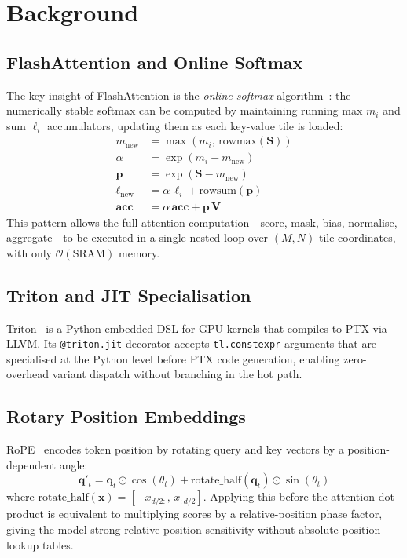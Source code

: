 \documentclass[10pt,twocolumn]{article}
\begin{document}
\section{Background}

\subsection{FlashAttention and Online Softmax}

The key insight of FlashAttention is the \emph{online softmax}
algorithm~\cite{milakov2018online}: the numerically stable softmax can be
computed by maintaining running max $m_i$ and sum $\ell_i$ accumulators,
updating them as each key-value tile is loaded:
\begin{align*}
  m_\text{new} &= \max(m_i,\, \text{rowmax}(\mathbf{S})) \\
  \alpha        &= \exp(m_i - m_\text{new}) \\
  \mathbf{p}   &= \exp(\mathbf{S} - m_\text{new}) \\
  \ell_\text{new} &= \alpha\,\ell_i + \text{rowsum}(\mathbf{p}) \\
  \mathbf{acc}   &= \alpha\,\mathbf{acc} + \mathbf{p}\,\mathbf{V}
\end{align*}
This pattern allows the full attention computation---score, mask, bias,
normalise, aggregate---to be executed in a single nested loop over
$(M, N)$ tile coordinates, with only $\mathcal{O}(\text{SRAM})$ memory.

\subsection{Triton and JIT Specialisation}

Triton~\cite{tillet2019triton} is a Python-embedded DSL for GPU kernels that
compiles to PTX via LLVM.  Its \texttt{@triton.jit} decorator accepts
\texttt{tl.constexpr} arguments that are specialised at the Python level
before PTX code generation, enabling zero-overhead variant dispatch without
branching in the hot path.

\subsection{Rotary Position Embeddings}

RoPE~\cite{su2021roformer} encodes token position by rotating query and key
vectors by a position-dependent angle:
\[
  \mathbf{q}'_t = \mathbf{q}_t \odot \cos(\theta_t) +
                  \text{rotate\_half}(\mathbf{q}_t) \odot \sin(\theta_t)
\]
where $\text{rotate\_half}(\mathbf{x}) = [-x_{d/2:},\, x_{:d/2}]$.
Applying this before the attention dot product is equivalent to multiplying
scores by a relative-position phase factor, giving the model strong
relative position sensitivity without absolute position lookup tables.
\end{document}
